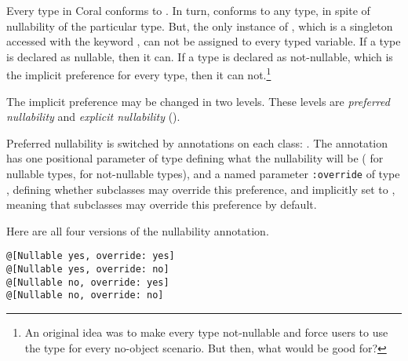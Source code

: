 Every type in Coral conforms to . In turn,  conforms to any type, in spite of nullability of the particular type. But, the only instance of , which is a singleton accessed with the keyword , can not be assigned to every typed variable. If a type is declared as nullable, then it can. If a type is declared as not-nullable, which is the implicit preference for every type, then it can not.\footnote{An original idea was to make every type not-nullable and force users to use the  type for every no-object scenario. But then, what would  be good for?}

The implicit preference may be changed in two levels. These levels are {\em preferred nullability} and {\em explicit nullability} (). 

Preferred nullability is switched by annotations on each class: . The annotation has one positional parameter of type  defining what the nullability will be ( for nullable types,  for not-nullable types), and a named parameter \lstinline[deletekeywords={override}]!:override! of type , defining whether subclasses may override this preference, and implicitly set to , meaning that subclasses may override this preference by default. 

\example Here are all four versions of the nullability annotation. 
\begin{lstlisting}[deletekeywords={override}]
@[Nullable yes, override: yes]
@[Nullable yes, override: no]
@[Nullable no, override: yes]
@[Nullable no, override: no]
\end{lstlisting}




